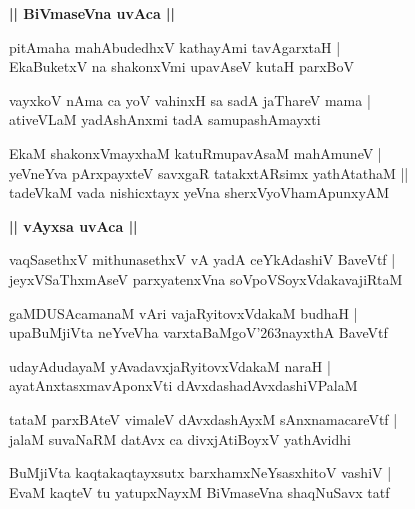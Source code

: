 \documentclass[twoside,12pt,openright]{book}
\def\S{\char'263}
\newcounter{shloka}[chapter]
\def\uvaca#1{\centerline{{\large\textbf{#1}}}}
\begin{document}
\uvaca{|| BiVmaseVna uvAca ||}

\begin{shloka}%
pitAmaha mahAbudedhxV kathayAmi tavAgarxtaH |\\
EkaBuketxV na shakonxVmi upavAseV kutaH parxBoV
\end{shloka}

\begin{shloka}%
vayxkoV nAma ca yoV vahinxH sa sadA jaThareV mama |\\
ativeVLaM yadAshAnxmi tadA samupashAmayxti
\end{shloka}

\begin{shloka}%
EkaM shakonxVmayxhaM katuRmupavAsaM mahAmuneV |\\
yeVneYva pArxpayxteV savxgaR tatakxtARsimx yathAtathaM ||\\
tadeVkaM vada nishicxtayx yeVna sherxVyoVhamApunxyAM 
\end{shloka}

\uvaca{|| vAyxsa uvAca ||}

\begin{shloka}%
vaqSasethxV mithunasethxV vA yadA ceYkAdashiV BaveVtf |\\
jeyxVSaThxmAseV parxyatenxVna soVpoVSoyxVdakavajiRtaM 
\end{shloka}

\begin{shloka}%
gaMDUSAcamanaM vAri vajaRyitovxVdakaM budhaH |\\
upaBuMjiVta neYveVha varxtaBaMgoV\S nayxthA BaveVtf
\end{shloka}

\begin{shloka}%
udayAdudayaM yAvadavxjaRyitovxVdakaM naraH |\\
ayatAnxtasxmavAponxVti dAvxdashadAvxdashiVPalaM
\end{shloka}

\begin{shloka}%
tataM parxBAteV vimaleV dAvxdashAyxM sAnxnamacareVtf |\\
jalaM suvaNaRM datAvx ca divxjAtiBoyxV yathAvidhi
\end{shloka}

\begin{shloka}%
BuMjiVta kaqtakaqtayxsutx barxhamxNeYsasxhitoV vashiV |\\
EvaM kaqteV tu yatupxNayxM BiVmaseVna shaqNuSavx tatf
\end{shloka}
\end{document}
